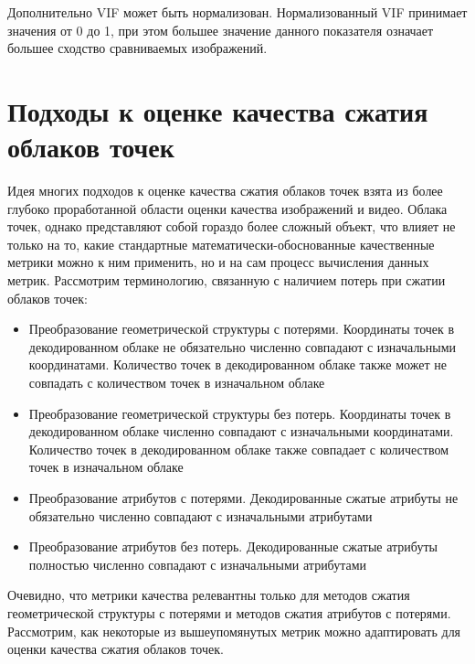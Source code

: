 Дополнительно VIF может быть нормализован. Нормализованный VIF принимает
значения от 0 до 1, при этом большее значение данного показателя означает
большее сходство сравниваемых изображений.



\section{Подходы к оценке качества сжатия облаков точек}




Идея многих подходов к оценке качества сжатия облаков точек взята из более
глубоко проработанной области оценки качества изображений и видео. Облака точек,
однако представляют собой гораздо более сложный объект, что влияет не только на
то, какие стандартные математически-обоснованные качественные метрики можно к
ним применить, но и на сам процесс вычисления данных метрик. Рассмотрим
терминологию, связанную с наличием потерь при сжатии облаков
точек\cite{CallForProposalV2}:

\begin{itemize}
    \item Преобразование геометрической структуры с потерями. Координаты точек в
    декодированном облаке не обязательно численно совпадают с изначальными
    координатами. Количество точек в декодированном облаке также может не
    совпадать с количеством точек в изначальном облаке
    \item Преобразование геометрической структуры без потерь. Координаты точек в
    декодированном облаке численно совпадают с изначальными координатами.
    Количество точек в декодированном облаке также совпадает с количеством точек
    в изначальном облаке
    \item Преобразование атрибутов с потерями. Декодированные сжатые атрибуты не
    обязательно численно совпадают с изначальными атрибутами
    \item Преобразование атрибутов без потерь. Декодированные сжатые атрибуты
    полностью численно совпадают с изначальными атрибутами
\end{itemize}

Очевидно, что метрики качества релевантны только для методов сжатия
геометрической структуры с потерями и методов сжатия атрибутов с потерями.
Рассмотрим, как некоторые из вышеупомянутых метрик можно адаптировать для оценки
качества сжатия облаков точек.


